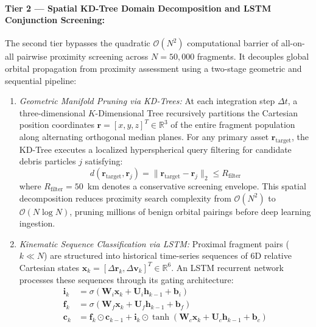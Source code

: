 \paragraph{Tier 2 --- Spatial KD-Tree Domain Decomposition and LSTM Conjunction Screening:}
The second tier bypasses the quadratic $\mathcal{O}(N^2)$ computational barrier of all-on-all pairwise proximity screening across $N = 50,000$ fragments. It decouples global orbital propagation from proximity assessment using a two-stage geometric and sequential pipeline:
\begin{enumerate}
    \item \textit{Geometric Manifold Pruning via KD-Trees:} At each integration step $\Delta t$, a three-dimensional $K$-Dimensional Tree recursively partitions the Cartesian position coordinates $\mathbf{r} = [x, y, z]^T \in \mathbb{R}^3$ of the entire fragment population along alternating orthogonal median planes. For any primary asset $\mathbf{r}_{\text{target}}$, the KD-Tree executes a localized hyperspherical query filtering for candidate debris particles $j$ satisfying:
    \begin{equation}
    d(\mathbf{r}_{\text{target}}, \mathbf{r}_j) = \|\mathbf{r}_{\text{target}} - \mathbf{r}_j\|_2 \le R_{\text{filter}}
    \label{eq:kdtree_filter}
    \end{equation}
    where $R_{\text{filter}} = 50$~km denotes a conservative screening envelope. This spatial decomposition reduces proximity search complexity from $\mathcal{O}(N^2)$ to $\mathcal{O}(N \log N)$, pruning millions of benign orbital pairings before deep learning ingestion.
    \item \textit{Kinematic Sequence Classification via LSTM:} Proximal fragment pairs ($k \ll N$) are structured into historical time-series sequences of 6D relative Cartesian states $\mathbf{x}_k = [\Delta \mathbf{r}_k, \Delta \mathbf{v}_k]^T \in \mathbb{R}^6$. An LSTM recurrent network processes these sequences through its gating architecture:
    \begin{align}
    \mathbf{i}_k &= \sigma(\mathbf{W}_i \mathbf{x}_k + \mathbf{U}_i \mathbf{h}_{k-1} + \mathbf{b}_i) \label{eq:lstm_i} \\
    \mathbf{f}_k &= \sigma(\mathbf{W}_f \mathbf{x}_k + \mathbf{U}_f \mathbf{h}_{k-1} + \mathbf{b}_f) \label{eq:lstm_f} \\
    \mathbf{c}_k &= \mathbf{f}_k \odot \mathbf{c}_{k-1} + \mathbf{i}_k \odot \tanh(\mathbf{W}_c \mathbf{x}_k + \mathbf{U}_c \mathbf{h}_{k-1} + \mathbf{b}_c) \label{eq:lstm_c} \\

\end{align}
\end{enumerate}

